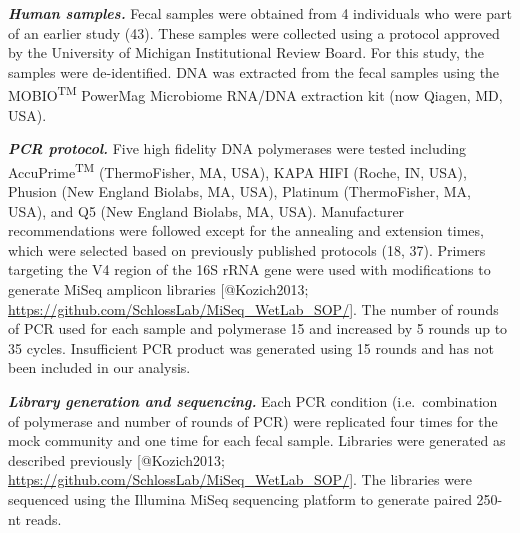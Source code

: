 \documentclass[11pt,]{article}
\begin{document}
\textbf{\emph{Human samples.}} Fecal samples were obtained from 4
individuals who were part of an earlier study (43). These samples were
collected using a protocol approved by the University of Michigan
Institutional Review Board. For this study, the samples were
de-identified. DNA was extracted from the fecal samples using the
MOBIO\textsuperscript{TM} PowerMag Microbiome RNA/DNA extraction kit
(now Qiagen, MD, USA).

\textbf{\emph{PCR protocol.}} Five high fidelity DNA polymerases were
tested including AccuPrime\textsuperscript{TM} (ThermoFisher, MA, USA),
KAPA HIFI (Roche, IN, USA), Phusion (New England Biolabs, MA, USA),
Platinum (ThermoFisher, MA, USA), and Q5 (New England Biolabs, MA, USA).
Manufacturer recommendations were followed except for the annealing and
extension times, which were selected based on previously published
protocols (18, 37). Primers targeting the V4 region of the 16S rRNA gene
were used with modifications to generate MiSeq amplicon libraries
{[}@Kozich2013;
\url{https://github.com/SchlossLab/MiSeq_WetLab_SOP/}{]}. The number of
rounds of PCR used for each sample and polymerase 15 and increased by 5
rounds up to 35 cycles. Insufficient PCR product was generated using 15
rounds and has not been included in our analysis.

\textbf{\emph{Library generation and sequencing.}} Each PCR condition
(i.e.~combination of polymerase and number of rounds of PCR) were
replicated four times for the mock community and one time for each fecal
sample. Libraries were generated as described previously {[}@Kozich2013;
\url{https://github.com/SchlossLab/MiSeq_WetLab_SOP/}{]}. The libraries
were sequenced using the Illumina MiSeq sequencing platform to generate
paired 250-nt reads.
\end{document}
